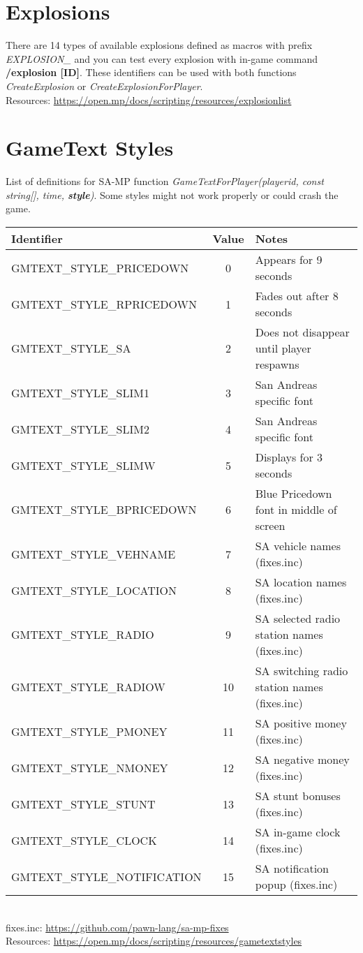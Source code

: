 \documentclass{article}
\begin{document}
\section{Explosions}
There are 14 types of available explosions defined as macros with prefix \textit{EXPLOSION\_} and you can test every explosion with in-game command \textbf{/explosion [ID]}. These identifiers can be used with both functions \textit{CreateExplosion} or \textit{CreateExplosionForPlayer}.
\bigskip
\\Resources: \url{https://open.mp/docs/scripting/resources/explosionlist}


\newpage
\section{GameText Styles}
\begin{sloppypar}
List of definitions for SA-MP function \textit{GameTextForPlayer(playerid, const string[], time, \textbf{style})}. Some styles might not work properly or could crash the game.
\end{sloppypar}
\bigskip
\noindent\begin{tabular}{ |l|c|l| } 
\hline
Identifier & Value & Notes \\
\hline
GMTEXT\_STYLE\_PRICEDOWN & 0 & Appears for 9 seconds \\
GMTEXT\_STYLE\_RPRICEDOWN & 1 & Fades out after 8 seconds \\
GMTEXT\_STYLE\_SA & 2 & Does not disappear until player respawns \\
GMTEXT\_STYLE\_SLIM1 & 3 & San Andreas specific font \\
GMTEXT\_STYLE\_SLIM2 & 4 & San Andreas specific font \\
GMTEXT\_STYLE\_SLIMW & 5 & Displays for 3 seconds \\
GMTEXT\_STYLE\_BPRICEDOWN & 6 & Blue Pricedown font in middle of screen \\
GMTEXT\_STYLE\_VEHNAME & 7 & SA vehicle names (fixes.inc) \\
GMTEXT\_STYLE\_LOCATION & 8 & SA location names (fixes.inc) \\
GMTEXT\_STYLE\_RADIO & 9 & SA selected radio station names (fixes.inc) \\
GMTEXT\_STYLE\_RADIOW & 10 & SA switching radio station names (fixes.inc) \\
GMTEXT\_STYLE\_PMONEY & 11 & SA positive money (fixes.inc) \\
GMTEXT\_STYLE\_NMONEY & 12 & SA negative money (fixes.inc) \\
GMTEXT\_STYLE\_STUNT & 13 & SA stunt bonuses (fixes.inc) \\
GMTEXT\_STYLE\_CLOCK & 14 & SA in-game clock (fixes.inc) \\
GMTEXT\_STYLE\_NOTIFICATION & 15 & SA notification popup (fixes.inc) \\
\hline
\end{tabular}
\bigskip
\\fixes.inc: \url{https://github.com/pawn-lang/sa-mp-fixes}
\bigskip
\\Resources: \url{https://open.mp/docs/scripting/resources/gametextstyles}
\end{document}
